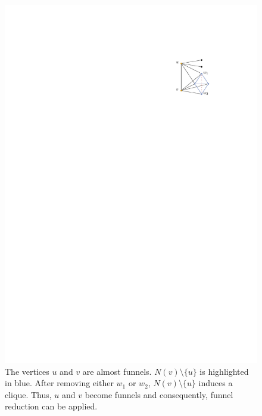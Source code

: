 \documentclass[12pt,a4paper,twoside]{scrartcl}
\numberwithin{equation}{section}
\begin{document}
\begin{figure}[htb]
	\captionsetup{belowskip=-1em}
	\includegraphics[scale=1.5]{images/alm_funnel}
	\centering
	\caption{The vertices $u$ and $v$ are almost funnels. $N(v)\setminus\{u\}$ is highlighted in blue. After removing either $w_1$ or $w_2$, $N(v)\setminus\{u\}$ induces a clique. Thus, $u$ and $v$ become funnels and consequently, funnel reduction can be applied.}
	\label{fig:alm_funnel}
\end{figure}
\end{document}
